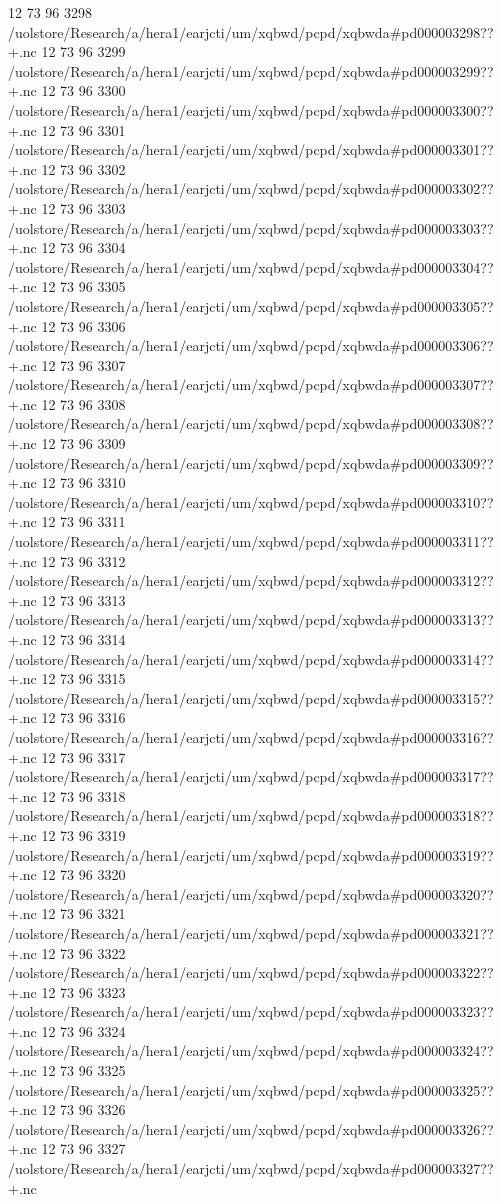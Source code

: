 12 73 96
3298
/uolstore/Research/a/hera1/earjcti/um/xqbwd/pcpd/xqbwda#pd000003298??+.nc
12 73 96
3299
/uolstore/Research/a/hera1/earjcti/um/xqbwd/pcpd/xqbwda#pd000003299??+.nc
12 73 96
3300
/uolstore/Research/a/hera1/earjcti/um/xqbwd/pcpd/xqbwda#pd000003300??+.nc
12 73 96
3301
/uolstore/Research/a/hera1/earjcti/um/xqbwd/pcpd/xqbwda#pd000003301??+.nc
12 73 96
3302
/uolstore/Research/a/hera1/earjcti/um/xqbwd/pcpd/xqbwda#pd000003302??+.nc
12 73 96
3303
/uolstore/Research/a/hera1/earjcti/um/xqbwd/pcpd/xqbwda#pd000003303??+.nc
12 73 96
3304
/uolstore/Research/a/hera1/earjcti/um/xqbwd/pcpd/xqbwda#pd000003304??+.nc
12 73 96
3305
/uolstore/Research/a/hera1/earjcti/um/xqbwd/pcpd/xqbwda#pd000003305??+.nc
12 73 96
3306
/uolstore/Research/a/hera1/earjcti/um/xqbwd/pcpd/xqbwda#pd000003306??+.nc
12 73 96
3307
/uolstore/Research/a/hera1/earjcti/um/xqbwd/pcpd/xqbwda#pd000003307??+.nc
12 73 96
3308
/uolstore/Research/a/hera1/earjcti/um/xqbwd/pcpd/xqbwda#pd000003308??+.nc
12 73 96
3309
/uolstore/Research/a/hera1/earjcti/um/xqbwd/pcpd/xqbwda#pd000003309??+.nc
12 73 96
3310
/uolstore/Research/a/hera1/earjcti/um/xqbwd/pcpd/xqbwda#pd000003310??+.nc
12 73 96
3311
/uolstore/Research/a/hera1/earjcti/um/xqbwd/pcpd/xqbwda#pd000003311??+.nc
12 73 96
3312
/uolstore/Research/a/hera1/earjcti/um/xqbwd/pcpd/xqbwda#pd000003312??+.nc
12 73 96
3313
/uolstore/Research/a/hera1/earjcti/um/xqbwd/pcpd/xqbwda#pd000003313??+.nc
12 73 96
3314
/uolstore/Research/a/hera1/earjcti/um/xqbwd/pcpd/xqbwda#pd000003314??+.nc
12 73 96
3315
/uolstore/Research/a/hera1/earjcti/um/xqbwd/pcpd/xqbwda#pd000003315??+.nc
12 73 96
3316
/uolstore/Research/a/hera1/earjcti/um/xqbwd/pcpd/xqbwda#pd000003316??+.nc
12 73 96
3317
/uolstore/Research/a/hera1/earjcti/um/xqbwd/pcpd/xqbwda#pd000003317??+.nc
12 73 96
3318
/uolstore/Research/a/hera1/earjcti/um/xqbwd/pcpd/xqbwda#pd000003318??+.nc
12 73 96
3319
/uolstore/Research/a/hera1/earjcti/um/xqbwd/pcpd/xqbwda#pd000003319??+.nc
12 73 96
3320
/uolstore/Research/a/hera1/earjcti/um/xqbwd/pcpd/xqbwda#pd000003320??+.nc
12 73 96
3321
/uolstore/Research/a/hera1/earjcti/um/xqbwd/pcpd/xqbwda#pd000003321??+.nc
12 73 96
3322
/uolstore/Research/a/hera1/earjcti/um/xqbwd/pcpd/xqbwda#pd000003322??+.nc
12 73 96
3323
/uolstore/Research/a/hera1/earjcti/um/xqbwd/pcpd/xqbwda#pd000003323??+.nc
12 73 96
3324
/uolstore/Research/a/hera1/earjcti/um/xqbwd/pcpd/xqbwda#pd000003324??+.nc
12 73 96
3325
/uolstore/Research/a/hera1/earjcti/um/xqbwd/pcpd/xqbwda#pd000003325??+.nc
12 73 96
3326
/uolstore/Research/a/hera1/earjcti/um/xqbwd/pcpd/xqbwda#pd000003326??+.nc
12 73 96
3327
/uolstore/Research/a/hera1/earjcti/um/xqbwd/pcpd/xqbwda#pd000003327??+.nc
